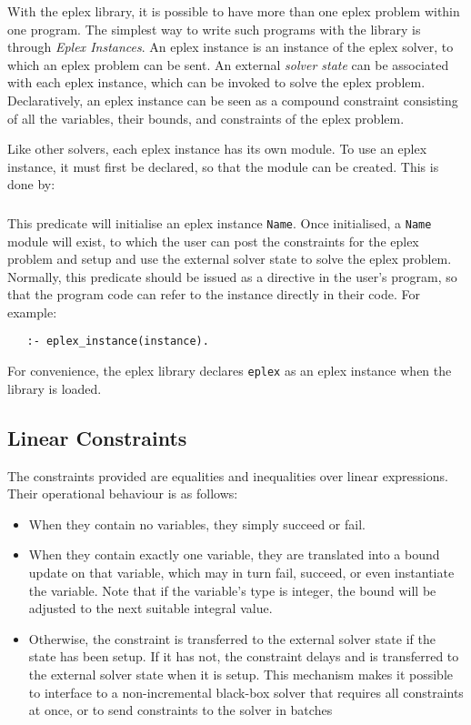 With the eplex library, it is possible to have more than one eplex problem
within one program. The simplest way to write such programs with the
library is through {\it Eplex Instances}. An eplex instance is an instance
of the eplex solver, to which an eplex problem can be sent. An external
{\it solver state} can be associated with each eplex instance, which can be
invoked to solve the eplex problem. Declaratively, an eplex instance can be
seen as a compound constraint consisting of all the variables, their bounds, and
constraints of the eplex problem.

Like other solvers, each eplex instance has its own module. To use an eplex
instance, it must first be declared, so that the module can be created.
This is done by:

\subsubsection{}

This predicate will initialise an eplex instance {\tt Name}. Once
initialised, a {\tt Name} module will exist, to which the user can post the 
constraints for the eplex problem and setup and use the external solver
state to solve the eplex problem. Normally, this predicate should be issued
as a directive in the user's program, so that the program code can refer to
the instance directly in their code. For example:

\begin{verbatim}
   :- eplex_instance(instance).
\end{verbatim}


For convenience, the eplex library declares {\tt eplex} as an eplex instance 
when the library is loaded. 

\subsection{Linear Constraints}
\label{linear-constraints}
The constraints provided are equalities and inequalities over
linear expressions. 
Their operational behaviour is as follows:
\begin{itemize}
\item When they contain no variables, they simply succeed or fail.
\item When they contain exactly one variable, they are translated into
a bound update on that variable, which may in turn fail, succeed,
or even instantiate the variable.
Note that if the variable's type is integer, the bound will be adjusted
to the next suitable integral value.
\item Otherwise, the constraint is transferred to the external solver state
if the state has been setup. If it has not, the constraint
delays and is transferred to the external solver state when it is setup.
This mechanism makes it possible to interface to a non-incremental
black-box solver that requires all constraints at once,
or to send constraints to the solver in batches
\end{itemize}


